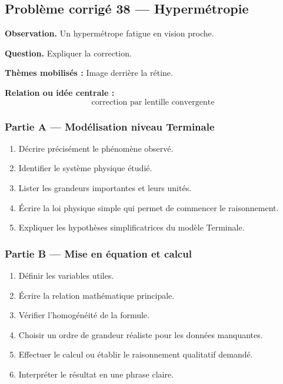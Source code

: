 \documentclass[11pt,a4paper]{article}
\begin{document}
\subsection{Problème corrigé 38 — Hypermétropie}

\begin{exercicebox}
\textbf{Observation.} Un hypermétrope fatigue en vision proche.

\medskip
\textbf{Question.} Expliquer la correction.

\medskip
\textbf{Thèmes mobilisés :} Image derrière la rétine.

\medskip
\textbf{Relation ou idée centrale :}
\[
\text{correction par lentille convergente}
\]
\end{exercicebox}

\subsubsection*{Partie A — Modélisation niveau Terminale}

\begin{enumerate}
  \item Décrire précisément le phénomène observé.
  \item Identifier le système physique étudié.
  \item Lister les grandeurs importantes et leurs unités.
  \item Écrire la loi physique simple qui permet de commencer le raisonnement.
  \item Expliquer les hypothèses simplificatrices du modèle Terminale.
\end{enumerate}

\subsubsection*{Partie B — Mise en équation et calcul}

\begin{enumerate}
  \item Définir les variables utiles.
  \item Écrire la relation mathématique principale.
  \item Vérifier l'homogénéité de la formule.
  \item Choisir un ordre de grandeur réaliste pour les données manquantes.
  \item Effectuer le calcul ou établir le raisonnement qualitatif demandé.
  \item Interpréter le résultat en une phrase claire.
\end{enumerate}
\end{document}
